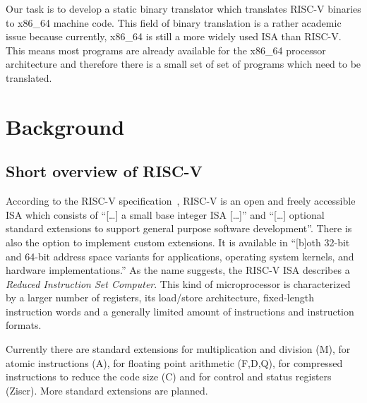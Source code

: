 \documentclass[course=eragp]{aspdoc}
\begin{document}
\par


\par

Our task is to develop a static binary translator which translates RISC-V binaries to x86\_64
machine code. This field of binary translation is a rather academic issue because currently, x86\_64
is still a more widely used ISA than RISC-V.\cite{riscv_rises} This means most programs are already
available for the x86\_64 processor architecture and therefore there is a small set of set of
programs which need to be translated.

\section{Background}
\subsection{Short overview of RISC-V}

According to the RISC-V specification~\cite{rvspec}, RISC-V is an open and freely accessible ISA
which consists of ``[\ldots] a small base integer ISA [\ldots]'' and ``[\ldots] optional standard
extensions to support general purpose software development''\cite[p.~1]{rvspec}. There is also the
option to implement custom extensions. It is available in ``[b]oth 32-bit and 64-bit address space
variants for applications, operating system kernels, and hardware
implementations.''\cite[p.~1]{rvspec} As the name suggests, the RISC-V ISA describes a \emph{Reduced
    Instruction Set Computer}. This kind of microprocessor is characterized by a larger number of
registers, its load/store architecture, fixed-length instruction words and a generally limited
amount of instructions and instruction formats.\cite{RISCvCISC}

\par

Currently there are standard extensions for multiplication and division (M), for atomic instructions
(A), for floating point arithmetic (F,D,Q), for compressed instructions to reduce the code size (C)
and for control and status registers (Ziscr). More standard extensions are planned.\cite{rvspec}
\end{document}
